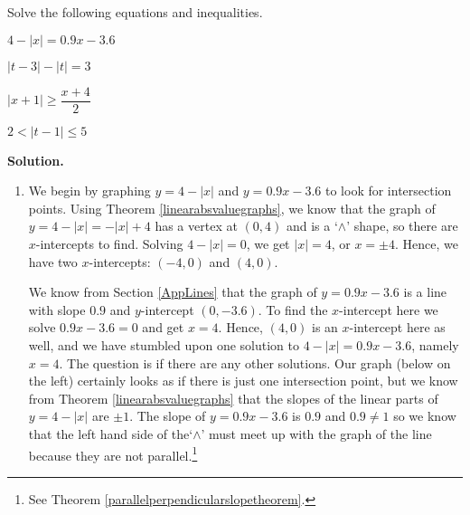 \begin{ex} \label{abseqnineqex}  Solve the following equations and inequalities.  

\begin{enumerate}

\begin{multicols}{4}

\item $4-|x| = 0.9x  - 3.6$ 

\item  $|t-3|  - |t|= 3$ 

\item $|x+1|\geq \dfrac{x+4}{2}$

\item $2 < |t-1| \leq 5$ 


\end{multicols}

\end{enumerate}


{\bf Solution.}  
\begin{enumerate}

\item  We begin by graphing $y = 4 - |x|$ and $y = 0.9x - 3.6$ to look for intersection points. Using Theorem \ref{linearabsvaluegraphs}, we know that the graph of $y = 4-|x| = -|x|+4$ has a vertex at $(0,4)$ and is a `$\wedge$' shape, so there are $x$-intercepts to find.  Solving $4-|x| = 0$, we get $|x| = 4$, or  $x = \pm 4$.  Hence, we have two $x$-intercepts: $(-4,0)$ and $(4,0)$.    

\medskip

We know from Section \ref{AppLines} that the graph of $y = 0.9x - 3.6$ is a line with slope $0.9$ and $y$-intercept $(0, -3.6)$. To find the $x$-intercept here we solve $0.9x - 3.6 = 0$ and get $x = 4$.  Hence, $(4,0)$ is an $x$-intercept here as well, and we have stumbled upon one solution to $4-|x| = 0.9x - 3.6$, namely $x = 4$.  The question is if there are any other solutions.  Our graph (below on the left) certainly looks as if there is just one intersection point, but we know from Theorem \ref{linearabsvaluegraphs} that the slopes of the linear parts of $y = 4 - |x|$ are $\pm 1$.  The slope of $y =  0.9x - 3.6$ is $0.9$ and $0.9 \neq 1$ so we know that the left hand side of the`$\wedge$' must meet up with the graph of the line because they are not parallel.\footnote{See Theorem \ref{parallelperpendicularslopetheorem}.}


\end{enumerate}
\end{ex}
